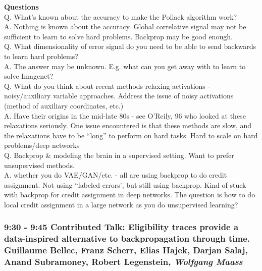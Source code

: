 \documentclass[12pt]{article}
\begin{document}
\textbf{Questions} \\

Q. What's known about the accuracy to make the Pollack algorithm work? \\

A. Nothing is known about the accuracy. Global correlative signal may not be sufficient to learn to solve hard problems. Backprop may be good enough. \\

Q. What dimensionality of error signal do you need to be able to send backwards to learn hard problems? \\

A. The answer may be unknown. E.g. what can you get away with to learn to solve Imagenet?  \\

Q. What do you think about recent methods relaxing activations - noisy/auxiliary variable approaches. Address the issue of noisy activations (method of auxiliary coordinates, etc.) \\

A. Have their origins in the mid-late 80s - see O'Reily, 96 who looked at these relaxations seriously. One issue encountered is that these methods are slow, and the relaxations have to be ``long'' to perform on hard tasks. Hard to scale on hard problems/deep networks \\

Q. Backprop \& modeling the brain in a supervised setting. Want to prefer unsupervised methods. \\

A. whether you do VAE/GAN/etc. - all are using backprop to do credit assignment. Not using ``labeled errors', but still using backprop. Kind of stuck with backprop for credit assignment in deep networks. The question is how to do local credit assignment in a large network as you do unsupervised learning? \\


\subsubsection{9:30 - 9:45 Contributed Talk: Eligibility traces provide a data-inspired alternative to backpropagation through time. \textbf{Guillaume Bellec}, Franz Scherr, Elias Hajek, Darjan Salaj, Anand Subramoney, Robert Legenstein, \textit{Wolfgang Maass}}
\end{document}
